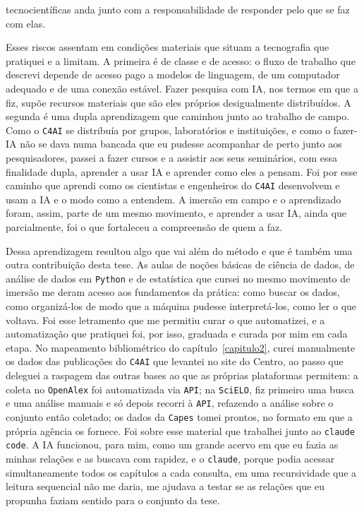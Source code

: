 tecnocientíficas anda junto com a responsabilidade de responder pelo que se faz com elas.

Esses riscos assentam em condições materiais que situam a tecnografia que pratiquei e a limitam. A primeira é de classe e de acesso: o fluxo de trabalho que descrevi depende de acesso pago a modelos de linguagem, de um computador adequado e de uma conexão estável. Fazer pesquisa com IA, nos termos em que a fiz, supõe recursos materiais que são eles próprios desigualmente distribuídos. A segunda é uma dupla aprendizagem que caminhou junto ao trabalho de campo. Como o \texttt{C4AI} se distribuía por grupos, laboratórios e instituições, e como o fazer-IA não se dava numa bancada que eu pudesse acompanhar de perto junto aos pesquisadores, passei a fazer cursos e a assistir aos seus seminários, com essa finalidade dupla, aprender a usar IA e aprender como eles a pensam. Foi por esse caminho que aprendi como os cientistas e engenheiros do \texttt{C4AI} desenvolvem e usam a IA e o modo como a entendem. A imersão em campo e o aprendizado foram, assim, parte de um mesmo movimento, e aprender a usar IA, ainda que parcialmente, foi o que fortaleceu a compreensão de quem a faz.

Dessa aprendizagem resultou algo que vai além do método e que é também uma outra contribuição desta tese. As aulas de noções básicas de ciência de dados, de análise de dados em \texttt{Python} e de estatística que cursei no mesmo movimento de imersão me deram acesso aos fundamentos da prática: como buscar os dados, como organizá-los de modo que a máquina pudesse interpretá-los, como ler o que voltava. Foi esse letramento que me permitiu curar o que automatizei, e a automatização que pratiquei foi, por isso, graduada e curada por mim em cada etapa. No mapeamento bibliométrico do capítulo~\ref{capitulo2}, curei manualmente os dados das publicações do \texttt{C4AI} que levantei no site do Centro, ao passo que deleguei a raspagem das outras bases ao que as próprias plataformas permitem: a coleta no \texttt{OpenAlex} foi automatizada via \texttt{API}; na \texttt{SciELO}, fiz primeiro uma busca e uma análise manuais e só depois recorri à \texttt{API}, refazendo a análise sobre o conjunto então coletado; os dados da \texttt{Capes} tomei prontos, no formato em que a própria agência os fornece. Foi sobre esse material que trabalhei junto ao \texttt{claude code}. A IA funcionou, para mim, como um grande acervo em que eu fazia as minhas relações e as buscava com rapidez, e o \texttt{claude}, porque podia acessar simultaneamente todos os capítulos a cada consulta, em uma recursividade que a leitura sequencial não me daria, me ajudava a testar se as relações que eu propunha faziam sentido para o conjunto da tese. 

